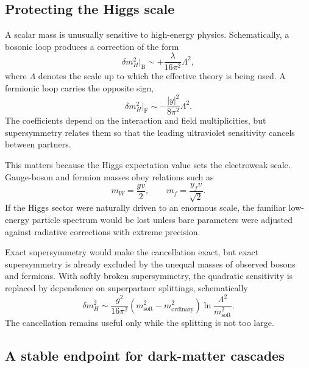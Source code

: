 \subsection{Protecting the Higgs scale}

A scalar mass is unusually sensitive to high-energy physics. Schematically, a bosonic loop produces a correction of the form
\begin{equation}
\delta m_H^2\big|_{\mathrm B}
\sim +\frac{\lambda}{16\pi^2}\Lambda^2,
\end{equation}
where \(\Lambda\) denotes the scale up to which the effective theory is being used. A fermionic loop carries the opposite sign,
\begin{equation}
\delta m_H^2\big|_{\mathrm F}
\sim -\frac{|y|^2}{8\pi^2}\Lambda^2.
\end{equation}
The coefficients depend on the interaction and field multiplicities, but supersymmetry relates them so that the leading ultraviolet sensitivity cancels between partners.

This matters because the Higgs expectation value sets the electroweak scale. Gauge-boson and fermion masses obey relations such as
\begin{equation}
m_W=\frac{gv}{2},
\qquad
m_f=\frac{y_fv}{\sqrt2}.
\end{equation}
If the Higgs sector were naturally driven to an enormous scale, the familiar low-energy particle spectrum would be lost unless bare parameters were adjusted against radiative corrections with extreme precision.

Exact supersymmetry would make the cancellation exact, but exact supersymmetry is already excluded by the unequal masses of observed bosons and fermions. With softly broken supersymmetry, the quadratic sensitivity is replaced by dependence on superpartner splittings, schematically
\begin{equation}
\delta m_H^2
\sim
\frac{g^2}{16\pi^2}
\left(m_{\mathrm{soft}}^2-m_{\mathrm{ordinary}}^2\right)
\ln\frac{\Lambda^2}{m_{\mathrm{soft}}^2}.
\end{equation}
The cancellation remains useful only while the splitting is not too large.

\subsection{A stable endpoint for dark-matter cascades}

